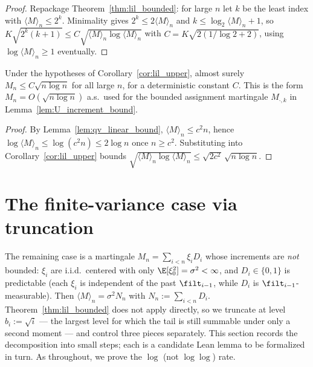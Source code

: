 \begin{proof}
Repackage Theorem~\ref{thm:lil_bounded}: for large $n$ let $k$ be the least index with
$\langle M\rangle_n\le 2^k$. Minimality gives $2^k\le 2\langle M\rangle_n$ and
$k\le\log_2\langle M\rangle_n+1$, so
$K\sqrt{2^k(k+1)}\le C\sqrt{\langle M\rangle_n\log\langle M\rangle_n}$ with
$C=K\sqrt{2(1/\log 2+2)}$, using $\log\langle M\rangle_n\ge1$ eventually.
\end{proof}

\begin{corollary}\label{cor:lil_upper_nat}
Under the hypotheses of Corollary~\ref{cor:lil_upper}, almost surely
$M_n \le C\sqrt{n\log n}$ for all large $n$, for a deterministic constant $C$. This is the form
$M_n = O(\sqrt{n\log n})$ a.s.\ used for the bounded assignment martingale
$M_{\cdot,k}$ in Lemma~\ref{lem:U_increment_bound}.
\end{corollary}

\begin{proof}
By Lemma~\ref{lem:qv_linear_bound}, $\langle M\rangle_n\le c^2 n$, hence
$\log\langle M\rangle_n\le\log(c^2 n)\le 2\log n$ once $n\ge c^2$. Substituting into
Corollary~\ref{cor:lil_upper} bounds $\sqrt{\langle M\rangle_n\log\langle M\rangle_n}
\le\sqrt{2c^2}\,\sqrt{n\log n}$.
\end{proof}

\section{The finite-variance case via truncation}
\label{sec:pre_lil_trunc}

The remaining case is a martingale $M_n = \sum_{i<n}\xi_i D_i$ whose increments are
\emph{not} bounded: $\xi_i$ are i.i.d.\ centered with only $\E[\xi_0^2]=\sigma^2<\infty$,
and $D_i\in\{0,1\}$ is predictable (each $\xi_i$ is independent of the past $\filt_{i-1}$,
while $D_i$ is $\filt_{i-1}$-measurable). Then $\langle M\rangle_n=\sigma^2 N_n$ with
$N_n:=\sum_{i<n}D_i$. Theorem~\ref{thm:lil_bounded} does not apply directly, so we
truncate at level $b_i:=\sqrt{i}$ --- the largest level for which the tail is still
summable under only a second moment --- and control three pieces separately. This section
records the decomposition into small steps; each is a candidate Lean lemma to be formalized
in turn. As throughout, we prove the $\log$ (not $\log\log$) rate.


